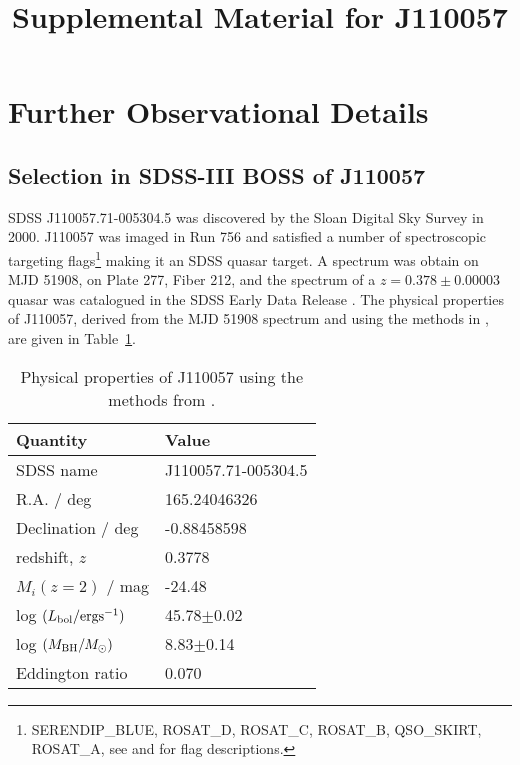 \documentclass[11pt,a4paper]{article}
\begin{document}
   \title{Supplemental Material for J110057}
\maketitle


\section*{Further Observational Details}

\subsection*{Selection in SDSS-III BOSS of J110057}
SDSS J110057.71-005304.5 was discovered by the Sloan Digital Sky
Survey in 2000.  J110057 was imaged in Run 756 and satisfied a number
of spectroscopic targeting flags\footnote{SERENDIP\_BLUE, ROSAT\_D,
ROSAT\_C, ROSAT\_B, QSO\_SKIRT, ROSAT\_A, see \citet{EDR} and
\citet{Richards2002} for flag descriptions.}  making it an SDSS quasar
target. A spectrum was obtain on MJD 51908, on Plate 277, Fiber 212,
and the spectrum of a $z=0.378\pm0.00003$ quasar was catalogued in the
SDSS Early Data Release \citep{Schneider2002}. The physical properties
of J110057, derived from the MJD 51908 spectrum and using the methods
in \citet{Shen2011}, are given in Table~\ref{tab:Shen_props}.

\begin{table}[]
    \centering
    \begin{tabular}{l l }
      \hline \hline 
      Quantity &  Value \\
      \hline 
      SDSS name        &        J110057.71-005304.5 \\
      R.A. / deg                   &  165.24046326 \\
      Declination / deg        &   -0.88458598 \\ 
      redshift, $z$     &   0.3778 \\
      $M_{i}(z=2)$  / mag                 &   -24.48  \\
      log $(L_{\rm bol} / {\rm erg s}^{-1}) $   &  45.78$\pm$0.02 \\
      log $(M_{\rm BH} / M_{\odot})  $   &  8.83$\pm$0.14 \\
      Eddington ratio  &        0.070 \\
      \hline \hline 
    \end{tabular}
    \caption{Physical properties of J110057 using the methods from 
      \citet{Shen2011}.} 
    \label{tab:Shen_props}
\end{table}
\end{document}
